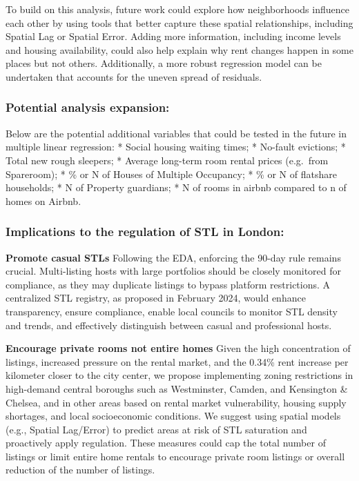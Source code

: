 \documentclass[
  a4paper,
  DIV=11,
  numbers=noendperiod]{scrartcl}
\begin{document}
To build on this analysis, future work could explore how neighborhoods
influence each other by using tools that better capture these spatial
relationships, including Spatial Lag or Spatial Error. Adding more
information, including income levels and housing availability, could
also help explain why rent changes happen in some places but not others.
Additionally, a more robust regression model can be undertaken that
accounts for the uneven spread of residuals.

\subsubsection{Potential analysis
expansion:}\label{potential-analysis-expansion}

Below are the potential additional variables that could be tested in the
future in multiple linear regression: * Social housing waiting times; *
No-fault evictions; * Total new rough sleepers; * Average long-term room
rental prices (e.g.~from Spareroom); * \% or N of Houses of Multiple
Occupancy; * \% or N of flatshare households; * N of Property guardians;
* N of rooms in airbnb compared to n of homes on Airbnb.

\subsubsection{Implications to the regulation of STL in
London:}\label{implications-to-the-regulation-of-stl-in-london}

\textbf{Promote casual STLs} Following the EDA, enforcing the 90-day
rule remains crucial. Multi-listing hosts with large portfolios should
be closely monitored for compliance, as they may duplicate listings to
bypass platform restrictions. A centralized STL registry, as proposed in
February 2024, would enhance transparency, ensure compliance, enable
local councils to monitor STL density and trends, and effectively
distinguish between casual and professional hosts.

\textbf{Encourage private rooms not entire homes} Given the high
concentration of listings, increased pressure on the rental market, and
the 0.34\% rent increase per kilometer closer to the city center, we
propose implementing zoning restrictions in high-demand central boroughs
such as Westminster, Camden, and Kensington \& Chelsea, and in other
areas based on rental market vulnerability, housing supply shortages,
and local socioeconomic conditions. We suggest using spatial models
(e.g., Spatial Lag/Error) to predict areas at risk of STL saturation and
proactively apply regulation. These measures could cap the total number
of listings or limit entire home rentals to encourage private room
listings or overall reduction of the number of listings.
\end{document}
